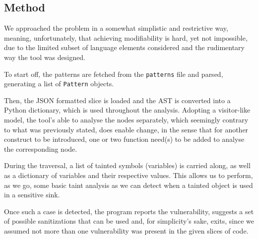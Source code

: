 \subsection*{Method}
\label{sec:experimental.method}

We approached the problem in a somewhat simplistic and restrictive way, meaning,
unfortunately, that achieving modifiability is hard, yet not impossible, due to
the limited subset of language elements considered and the rudimentary way the
tool was designed.

To start off, the patterns are fetched from the \verb|patterns| file and parsed,
generating a list of \verb|Pattern| objects.

Then, the JSON formatted slice is loaded and the AST is converted into a Python
dictionary, which is used throughout the analysis. Adopting a visitor-like
model, the tool's able to analyse the nodes separately, which seemingly contrary
to what was previously stated, does enable change, in the sense that for another
construct to be introduced, one or two function need(s) to be added to analyse
the corresponding node.

During the traversal, a list of tainted symbols (variables) is carried along, as
well as a dictionary of variables and their respective values. This allows us to
perform, as we go, some basic taint analysis as we can detect when a tainted
object is used in a sensitive sink.

Once such a case is detected, the program reports the vulnerability, suggests
a set of possible sanitizations that can be used and, for simplicity's sake,
exits, since we assumed not more than one vulnerability was present in the given
slices of code.
